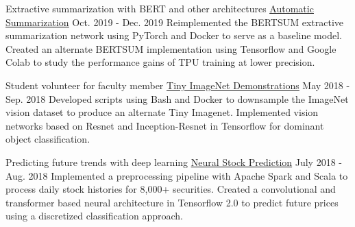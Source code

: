 

\begin{cventries}

  \cventry
  	{Extractive summarization with BERT and other architectures} %
		{
			\href{https://github.com/TidalPaladin/neural-summarizer}
      {\underline{Automatic Summarization}}
		} %
  	{Oct. 2019 - Dec. 2019} %
    {} %
	{
		Reimplemented the BERTSUM extractive summarization network using
		PyTorch and Docker to serve as a baseline model. Created an
		alternate BERTSUM implementation using Tensorflow and Google Colab
		to study the performance gains of TPU training at lower precision.
	}

  \cventry
  	{Student volunteer for faculty member} %
		{
			\href{https://github.com/TidalPaladin/tiny-imagenet-demo}
      {\underline{Tiny ImageNet Demonstrations}}
		} %
  	{May 2018 - Sep. 2018} %
    {} %
	{
		Developed scripts using Bash and Docker to downsample
		the ImageNet vision dataset to produce an alternate Tiny Imagenet.
		Implemented vision networks based on Resnet and
		Inception-Resnet in Tensorflow for dominant object
		classification.
	}

  \cventry
  	{Predicting future trends with deep learning} %
		{
			\href{https://github.com/TidalPaladin/trader}
      {\underline{Neural Stock Prediction}}
		} %
  	{July 2018 - Aug. 2018} %
    {} %
	{
		Implemented a preprocessing pipeline with Apache Spark and Scala
		to process daily stock histories for 8,000+ securities.
		Created a convolutional and transformer based neural architecture
		in Tensorflow 2.0 to predict future prices using a discretized
		classification approach.
	}

\end{cventries}
